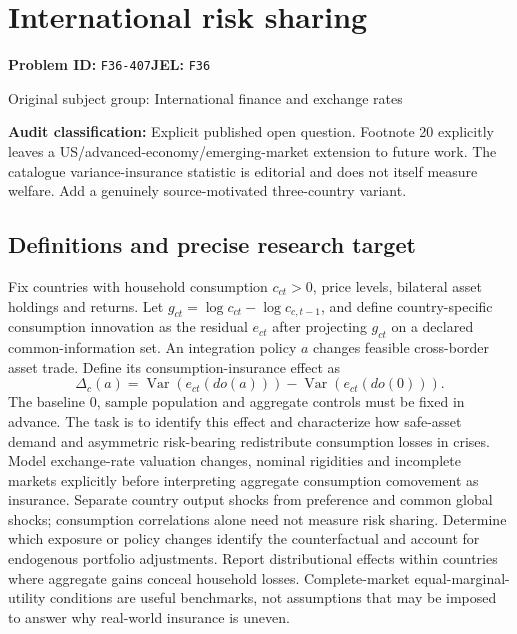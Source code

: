 \documentclass[11pt,a4paper]{article}
\begin{document}
\section*{International risk sharing}
\textbf{Problem ID:} \texttt{F36-407}\quad \textbf{JEL:} \texttt{F36}\par
\label{problem:OP-0335}
{\sffamily\small\color{muted}Original subject group: International finance and exchange rates\par}
\label{definitions:problem:30007617}
\textbf{Audit classification:} Explicit published open question. Footnote 20 explicitly leaves a US/advanced-economy/emerging-market extension to future work. The catalogue variance-insurance statistic is editorial and does not itself measure welfare. Add a genuinely source-motivated three-country variant.
\subsection*{Definitions and precise research target}
Fix countries with household consumption \(c_{ct}>0\), price levels, bilateral asset holdings and returns. Let \(g_{ct}=\log c_{ct}-\log c_{c,t-1}\), and define country-specific consumption innovation as the residual \(e_{ct}\) after projecting \(g_{ct}\) on a declared common-information set. An integration policy \(a\) changes feasible cross-border asset trade. Define its consumption-insurance effect as
\[\Delta_c(a)=\operatorname{Var}(e_{ct}(do(a)))-\operatorname{Var}(e_{ct}(do(0))).\]
The baseline \(0\), sample population and aggregate controls must be fixed in advance. The task is to identify this effect and characterize how safe-asset demand and asymmetric risk-bearing redistribute consumption losses in crises. Model exchange-rate valuation changes, nominal rigidities and incomplete markets explicitly before interpreting aggregate consumption comovement as insurance. Separate country output shocks from preference and common global shocks; consumption correlations alone need not measure risk sharing. Determine which exposure or policy changes identify the counterfactual and account for endogenous portfolio adjustments. Report distributional effects within countries where aggregate gains conceal household losses. Complete-market equal-marginal-utility conditions are useful benchmarks, not assumptions that may be imposed to answer why real-world insurance is uneven.
\end{document}
